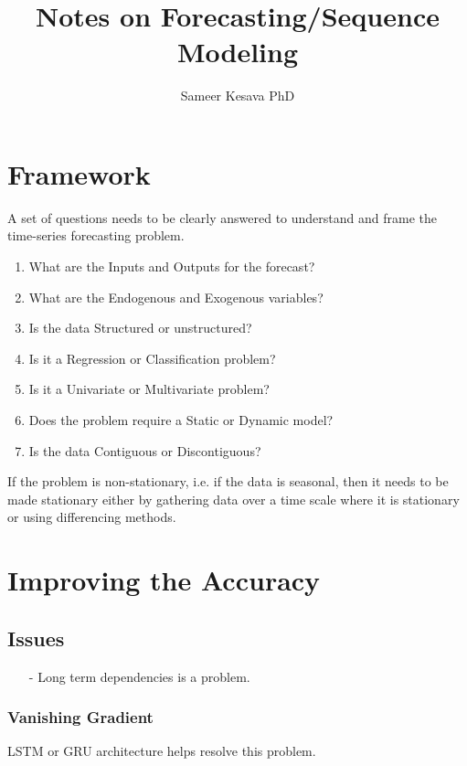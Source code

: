 \documentclass[a4paper, 12pt]{report}
\begin{document}
\title{Notes on Forecasting/Sequence Modeling}
\author{Sameer Kesava PhD}
\date{} %
\maketitle

\tableofcontents
\newpage



\chapter{Framework}
A set of questions needs to be clearly answered to understand and frame the time-series forecasting problem.

\begin{enumerate}
\item What are the Inputs and Outputs for the forecast?
\item What are the Endogenous and Exogenous variables?
\item Is the data Structured or unstructured?
\item Is it a Regression or Classification problem?
\item Is it a Univariate or Multivariate problem?
\item Does the problem require a Static or Dynamic model?
\item Is the data Contiguous or Discontiguous?
\end{enumerate}

If the problem is non-stationary, i.e. if the data is seasonal, then it needs to be made stationary either by gathering data over a time scale where it is stationary or using differencing methods.

\chapter{Improving the Accuracy}
\section{Issues}
\label{sec:issues}
\begin{itemize}
\item[-] Long term dependencies is a problem.
\end{itemize}

\subsection{Vanishing Gradient}
LSTM or GRU architecture helps resolve this problem.
\end{document}
